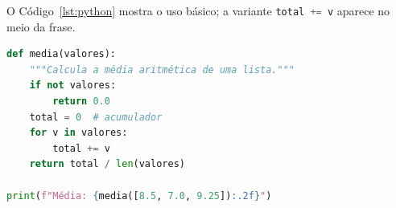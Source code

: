 \documentclass[12pt, a4paper, brazilian]{abntex2}
\begin{document}
O Código~\ref{lst:python} mostra o uso básico; a variante \lstinline[language=Python]{total += v}
aparece no meio da frase.

\begin{lstlisting}[language=Python,
    caption={Função em Python, com numeração de linhas e sintaxe colorida},
    label={lst:python}]
def media(valores):
    """Calcula a média aritmética de uma lista."""
    if not valores:
        return 0.0
    total = 0  # acumulador
    for v in valores:
        total += v
    return total / len(valores)

print(f"Média: {media([8.5, 7.0, 9.25]):.2f}")
\end{lstlisting}
\end{document}
